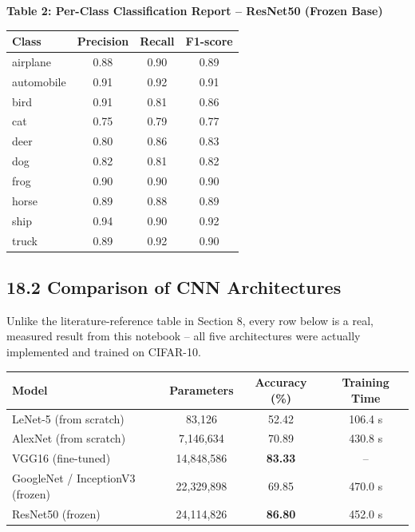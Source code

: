 \documentclass[11pt]{article}
\begin{document}
\vspace{3mm}
\textbf{Table 2: Per-Class Classification Report -- ResNet50 (Frozen Base)}
\begin{center}
\begin{tabular}{|l|c|c|c|}
\hline
Class & Precision & Recall & F1-score\\
\hline
airplane & 0.88 & 0.90 & 0.89\\
automobile & 0.91 & 0.92 & 0.91\\
bird & 0.91 & 0.81 & 0.86\\
cat & 0.75 & 0.79 & 0.77\\
deer & 0.80 & 0.86 & 0.83\\
dog & 0.82 & 0.81 & 0.82\\
frog & 0.90 & 0.90 & 0.90\\
horse & 0.89 & 0.88 & 0.89\\
ship & 0.94 & 0.90 & 0.92\\
truck & 0.89 & 0.92 & 0.90\\
\hline
\end{tabular}
\end{center}

\vspace{5mm}
\subsection*{18.2 Comparison of CNN Architectures}

Unlike the literature-reference table in Section 8, every row below
is a real, measured result from this notebook -- all five
architectures were actually implemented and trained on CIFAR-10.

\begin{center}
\begin{tabular}{|l|c|c|c|}
\hline
Model & Parameters & Accuracy (\%) & Training Time\\
\hline
LeNet-5 (from scratch) & 83,126 & 52.42 & 106.4 s\\
\hline
AlexNet (from scratch) & 7,146,634 & 70.89 & 430.8 s\\
\hline
VGG16 (fine-tuned) & 14,848,586 & \textbf{83.33} & --\\
\hline
GoogleNet / InceptionV3 (frozen) & 22,329,898 & 69.85 & 470.0 s\\
\hline
ResNet50 (frozen) & 24,114,826 & \textbf{86.80} & 452.0 s\\
\hline
\end{tabular}
\end{center}
\end{document}
